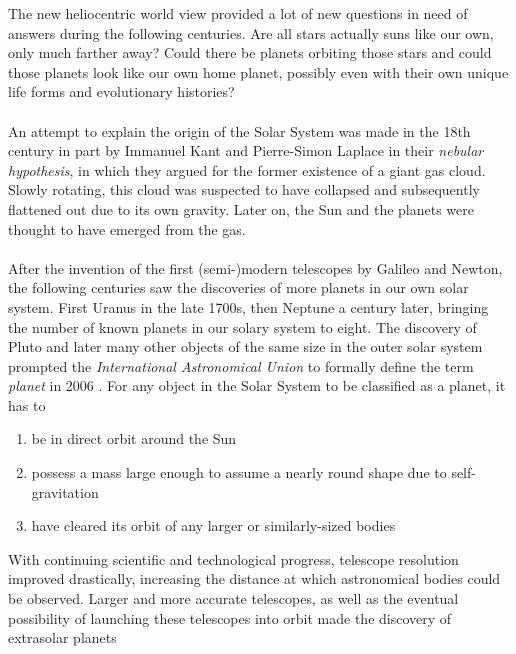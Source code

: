     \newpage \noindent
    The new heliocentric world view provided a lot of new questions in need of 
    answers during the following centuries. Are all stars actually suns like 
    our own, only much farther away? Could there be planets orbiting those 
    stars and could those planets look like our own home planet, possibly 
    even with their own unique life forms and evolutionary histories? \\
    \\
    An attempt to explain the origin of the Solar System was made in the 18th
    century in part by Immanuel Kant and Pierre-Simon Laplace in their
    \textit{nebular hypothesis}, in which they
    argued for the former existence of a giant gas cloud. Slowly rotating,
    this cloud was suspected to have collapsed and subsequently flattened out
    due to its own gravity. Later on, the Sun and the planets were thought 
    to have emerged from the gas. \\
    \\
    After the invention of the first (semi-)modern telescopes by 
    Galileo and Newton, the following centuries saw the discoveries of more 
    planets in our own solar system.
    First Uranus in the late 1700s, then Neptune a century later, bringing the 
    number of known planets in our solary system to eight.
    The discovery of Pluto and later many other objects of the same size in the 
    outer solar system prompted the \textit{International Astronomical Union} to 
    formally define the term \textit{planet} in 2006 \cite{IAU_planet_def}.
    For any object in the Solar System to be classified as a planet, it has to
    \begin{enumerate}
      \setlength{\itemsep}{2pt}%
      \setlength{\parskip}{0pt}%
      \item be in direct orbit around the Sun
      \item possess a mass large enough to assume a nearly round shape due 
        to self-gravitation
      \item have cleared its orbit of any larger or similarly-sized bodies
    \end{enumerate}
    With continuing scientific and technological progress, telescope resolution 
    improved drastically, increasing the distance at which astronomical 
    bodies could be observed. Larger and more 
    accurate telescopes, as well as the eventual possibility of launching 
    these telescopes into orbit made the discovery of extrasolar planets 
